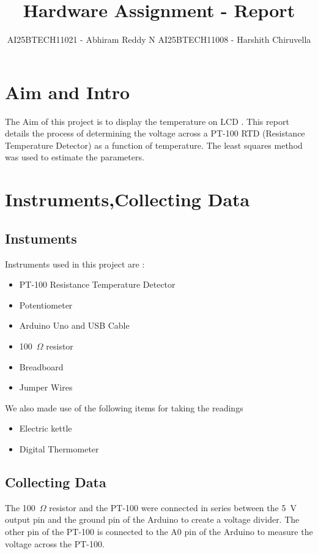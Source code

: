 \documentclass{article}
\title{\textbf{Hardware Assignment - Report}}
\author{AI25BTECH11021 - Abhiram Reddy N
 \hspace{0.5cm}   AI25BTECH11008 - Harshith Chiruvella}
\date{}
\begin{document}
\maketitle
\section*{Aim and Intro}
The Aim of this project is to display the temperature on LCD . This report details the process of determining the voltage across a PT-100 RTD (Resistance Temperature Detector) as a function of temperature. The least squares method was used to estimate the parameters.

\section*{Instruments,Collecting Data}

\subsection*{Instuments}

Instruments used in this project are :

\begin{itemize}
    \item PT-100 Resistance Temperature Detector
    \item Potentiometer
    \item Arduino Uno and USB Cable
    \item 100~$\Omega$ resistor
    \item Breadboard
    \item Jumper Wires
\end{itemize}

We also made use of the following items for taking the readings

\begin{itemize}
    \item Electric kettle
    \item Digital Thermometer
\end{itemize}

\subsection*{Collecting Data}

The 100~$\Omega$ resistor and the PT-100 were connected in series between the 5~V output pin and the ground pin of the Arduino to create a voltage divider. The other pin of the PT-100 is connected to the A0 pin of the Arduino to measure the voltage across the PT-100.
\end{document}
